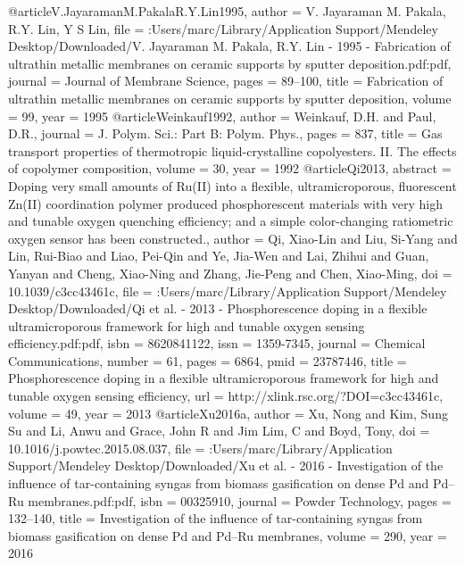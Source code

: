 @article{V.JayaramanM.PakalaR.Y.Lin1995,
author = {{V. Jayaraman   M. Pakala, R.Y. Lin}, Y S Lin},
file = {:Users/marc/Library/Application Support/Mendeley Desktop/Downloaded/V. Jayaraman M. Pakala, R.Y. Lin - 1995 - Fabrication of ultrathin metallic membranes on ceramic supports by sputter deposition.pdf:pdf},
journal = {Journal of Membrane Science},
pages = {89--100},
title = {{Fabrication of ultrathin metallic membranes on ceramic supports by sputter deposition}},
volume = {99},
year = {1995}
}
@article{Weinkauf1992,
author = {Weinkauf, D.H. and Paul, D.R.},
journal = {J. Polym. Sci.: Part B: Polym. Phys.},
pages = {837},
title = {{Gas transport properties of thermotropic liquid-crystalline copolyesters. II. The effects of copolymer composition}},
volume = {30},
year = {1992}
}
@article{Qi2013,
abstract = {Doping very small amounts of Ru(II) into a flexible, ultramicroporous, fluorescent Zn(II) coordination polymer produced phosphorescent materials with very high and tunable oxygen quenching efficiency; and a simple color-changing ratiometric oxygen sensor has been constructed.},
author = {Qi, Xiao-Lin and Liu, Si-Yang and Lin, Rui-Biao and Liao, Pei-Qin and Ye, Jia-Wen and Lai, Zhihui and Guan, Yanyan and Cheng, Xiao-Ning and Zhang, Jie-Peng and Chen, Xiao-Ming},
doi = {10.1039/c3cc43461c},
file = {:Users/marc/Library/Application Support/Mendeley Desktop/Downloaded/Qi et al. - 2013 - Phosphorescence doping in a flexible ultramicroporous framework for high and tunable oxygen sensing efficiency.pdf:pdf},
isbn = {8620841122},
issn = {1359-7345},
journal = {Chemical Communications},
number = {61},
pages = {6864},
pmid = {23787446},
title = {{Phosphorescence doping in a flexible ultramicroporous framework for high and tunable oxygen sensing efficiency}},
url = {http://xlink.rsc.org/?DOI=c3cc43461c},
volume = {49},
year = {2013}
}
@article{Xu2016a,
author = {Xu, Nong and Kim, Sung Su and Li, Anwu and Grace, John R and {Jim Lim}, C and Boyd, Tony},
doi = {10.1016/j.powtec.2015.08.037},
file = {:Users/marc/Library/Application Support/Mendeley Desktop/Downloaded/Xu et al. - 2016 - Investigation of the influence of tar-containing syngas from biomass gasification on dense Pd and Pd–Ru membranes.pdf:pdf},
isbn = {00325910},
journal = {Powder Technology},
pages = {132--140},
title = {{Investigation of the influence of tar-containing syngas from biomass gasification on dense Pd and Pd–Ru membranes}},
volume = {290},
year = {2016}
}
